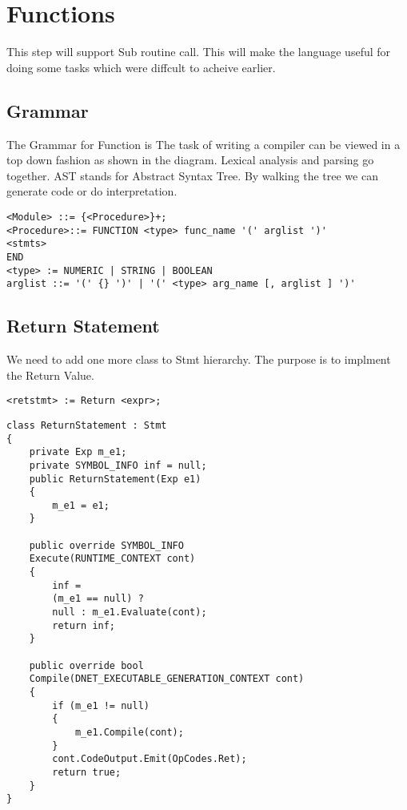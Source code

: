 \chapter{Functions}
This step will support Sub routine call. This will make the language useful for doing some tasks which were diffcult to acheive earlier.
\section{Grammar}
The Grammar for Function is
The task of writing a compiler can be viewed in a top down fashion as shown in the diagram. Lexical analysis and parsing go together. AST stands for Abstract Syntax Tree. By walking the tree we can generate code or do interpretation.

\lstset{style=csharp}
\begin{lstlisting}
<Module> ::= {<Procedure>}+;
<Procedure>::= FUNCTION <type> func_name '(' arglist ')'
<stmts>
END
<type> := NUMERIC | STRING | BOOLEAN
arglist ::= '(' {} ')' | '(' <type> arg_name [, arglist ] ')'
\end{lstlisting}

\section{Return Statement}
We need to add one more class to Stmt hierarchy. The purpose is to implment the Return Value.
\begin{verbatim}
<retstmt> := Return <expr>;
\end{verbatim}
\lstset{style=csharp}
\begin{lstlisting}
class ReturnStatement : Stmt
{
	private Exp m_e1;
	private SYMBOL_INFO inf = null;
	public ReturnStatement(Exp e1)
	{
		m_e1 = e1;
	}
	
	public override SYMBOL_INFO 
	Execute(RUNTIME_CONTEXT cont)
	{
		inf = 
		(m_e1 == null) ? 
		null : m_e1.Evaluate(cont);
		return inf;
	}

	public override bool 
	Compile(DNET_EXECUTABLE_GENERATION_CONTEXT cont)
	{
		if (m_e1 != null)
		{
			m_e1.Compile(cont);
		}
		cont.CodeOutput.Emit(OpCodes.Ret);
		return true;
	}
}
\end{lstlisting}

